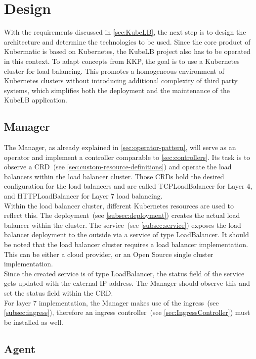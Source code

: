 \chapter{Design}

With the requirements discussed in \autoref{sec:KubeLB}, the next step is to design the architecture and determine the technologies to be used.
Since the core product of Kubermatic is based on Kubernetes, the KubeLB project also has to be operated in this context.
To adapt concepts from KKP, the goal is to use a Kubernetes cluster for load balancing.
This promotes a homogeneous environment of Kubernetes clusters without introducing additional complexity of third party systems, which simplifies both the deployment and the maintenance of the KubeLB application.

\section{Manager}\label{sec:manager}

The Manager, as already explained in \autoref{sec:operator-pattern}, will serve as an operator and implement a controller comparable to \autoref{sec:controllers}.
Its task is to observe a CRD~(see \autoref{sec:custom-resource-definitions}) and operate the load balancers within the load balancer cluster.
Those CRDs hold the desired configuration for the load balancers and are called TCPLoadBalancer for Layer 4, and HTTPLoadBalancer for Layer 7 load balancing.
\\
Within the load balancer cluster, different Kubernetes resources are used to reflect this.
The deployment~(see \autoref{subsec:deployment}) creates the actual load balancer within the cluster.
The service~(see \autoref{subsec:service}) exposes the load balancer deployment to the outside via a service of type LoadBalancer.
It should be noted that the load balancer cluster requires a load balancer implementation.
This can be either a cloud provider, or an Open Source single cluster implementation.
\\
Since the created service is of type LoadBalancer, the status field of the service gets updated with the external IP address.
The Manager should observe this and set the status field within the CRD.
\\
For layer 7 implementation, the Manager makes use of the ingress~(see \autoref{subsec:ingress}), therefore an ingress controller~(see \autoref{sec:IngressController}) must be installed as well.

\section{Agent}\label{sec:agent}

